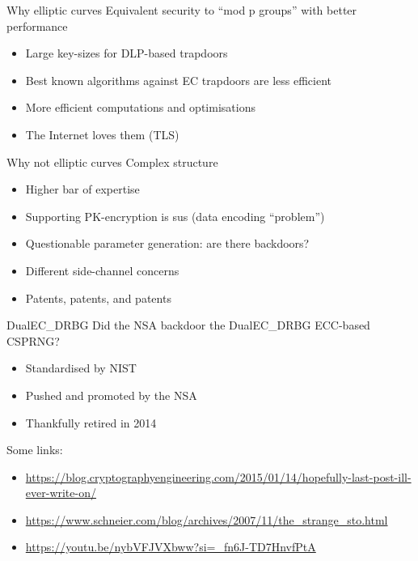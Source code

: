 \begin{frame}{Why elliptic curves}
  Equivalent security to \enquote{mod p groups} with better performance
  \begin{itemize}[<+(1)->]
    \item Large key-sizes for DLP-based trapdoors
    \item Best known algorithms against EC trapdoors are less efficient
    \item More efficient computations and optimisations
    \item The Internet loves them (TLS)
  \end{itemize}
\end{frame}

\begin{frame}{Why not elliptic curves}
  Complex structure
  \begin{itemize}[<+(1)->]
    \item Higher bar of expertise
    \item Supporting PK-encryption is sus (data encoding \enquote{problem})
    \item Questionable parameter generation: are there backdoors?
    \item Different side-channel concerns
    \item Patents, patents, and patents
  \end{itemize}
\end{frame}

\begin{frame}{DualEC\_DRBG}
  Did the NSA backdoor the DualEC\_DRBG ECC-based CSPRNG?
  \begin{itemize}[<+(1)->]
    \item Standardised by NIST
    \item Pushed and promoted by the NSA
    \item Thankfully retired in 2014
  \end{itemize}

  \pause
  Some links:
  \begin{itemize}
    \item {\scriptsize\url{https://blog.cryptographyengineering.com/2015/01/14/hopefully-last-post-ill-ever-write-on/}}
    \item {\scriptsize\url{https://www.schneier.com/blog/archives/2007/11/the_strange_sto.html}}
    \item {\scriptsize\url{https://youtu.be/nybVFJVXbww?si=_fn6J-TD7HnvfPtA}}
  \end{itemize}
\end{frame}

